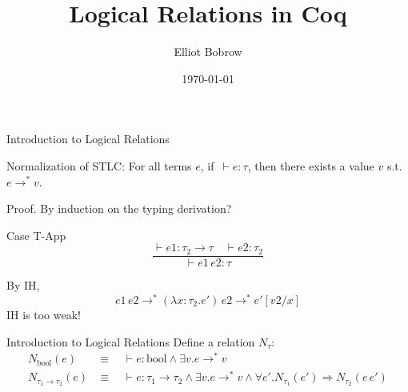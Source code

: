 \documentclass{beamer}
\title{Logical Relations in Coq}
\author{Elliot Bobrow}
\institute{UPenn REPL}
\date{\today}
\begin{document}
\begin{frame}
\titlepage
\end{frame}

\begin{frame}{Introduction to Logical Relations}
    \begin{theorem}
        Normalization of STLC: For all terms $e$, if $\,\vdash e : \tau$, then there exists a value $v$ s.t. $e\rightarrow^* v$.
    \end{theorem}
    \begin{block}{Proof.}
        By induction on the typing derivation?

        Case T-App $$\frac{\vdash e1 : \tau_2 \rightarrow \tau \quad \vdash e2 : \tau_2}{\vdash e1\,e2 : \tau}$$

        By IH,
        $$
        e1\,e2 \rightarrow^* (\lambda x:\tau_2.e')\,e2 \rightarrow^* e'[v2/x]
        $$
        IH is too weak!
    \end{block}
\end{frame}

\begin{frame}{Introduction to Logical Relations}
    Define a relation $N_\tau$:
    \begin{align*}
        N_{\text{bool}}(e) &\equiv \quad\vdash e:\text{bool} \wedge \exists v . e \rightarrow^* v \\
        N_{\tau_1\rightarrow\tau_2}(e) &\equiv \quad\vdash e: \tau_1\rightarrow\tau_2 \wedge\exists v . e \rightarrow^* v \wedge \forall e'. N_{\tau_1}(e') \Rightarrow N_{\tau_2}(e\, e')
    \end{align*}
\end{frame}
\end{document}
